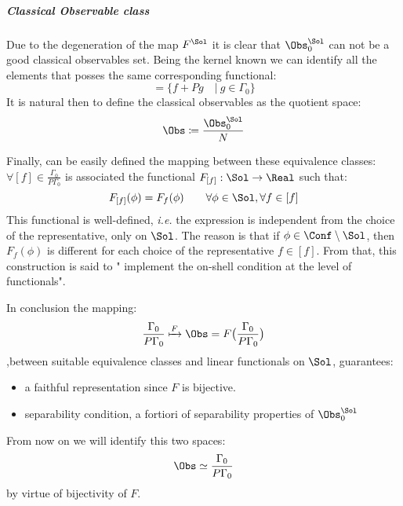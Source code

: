 \documentclass[Main]{subfiles}
\begin{document}
   			\subparagraph{Classical Observable class}
   					Due to the degeneration of the map $F^\Sol$ it is clear that $\Obs_0^\Sol$ can not be a good classical observables set.
   					Being the kernel known we can identify all the elements that posses the same corresponding functional:
   					\begin{displaymath}
   						[f] = \big\{f + P g \quad\vert\: g \in \Gamma_0\big\}
   					\end{displaymath}
   					It is natural then to define the classical observables as the quotient space:
   									\begin{displaymath}
   										\Obs \coloneqq \frac{\Obs_0^\Sol}{N}
   									\end{displaymath}
   									
   					Finally, can be easily defined the mapping between these equivalence classes:\\
   					$\forall [f] \in \frac{\Gamma_0}{P\Gamma_0}$ is associated the functional $F_{[f]} : \Sol \rightarrow  \Real$ such that:
   					\begin{displaymath}
   						F_{[f]} (\phi) = F_f(\phi) \qquad \forall \phi \in \Sol , \forall f \in [f]
   					\end{displaymath}
   					This functional is well-defined, \textit{i.e.} the expression is independent from the choice of the representative, only on $\Sol$. 
   					The reason is that if $\phi \in \Conf \setminus \Sol$, then $F_f(\phi)$ is different for each choice of the representative $f \in [f]$.
   					From that, this construction is said to " implement the  on-shell condition at the level of functionals".
   					
   					In conclusion the mapping:
   					\begin{displaymath}
   						\frac{\Gamma_0}{P \Gamma_0}  \xmapsto{F} \Obs = F \big( \frac{\Gamma_0}{P \Gamma_0}\big)
   					\end{displaymath}
   					,between suitable equivalence classes  and linear functionals on $\Sol$, guarantees:
   					\begin{itemize}
   						\item a faithful representation since $F$ is bijective.
   						\item separability condition, a fortiori of separability properties of $\Obs_0^\Sol$
   					\end{itemize}
   					From now on we will identify this two spaces:
   					\begin{displaymath}
   						\Obs \simeq 	\frac{\Gamma_0}{P \Gamma_0}
   					\end{displaymath}
   					by virtue of bijectivity of $F$.
   			
\end{document}
